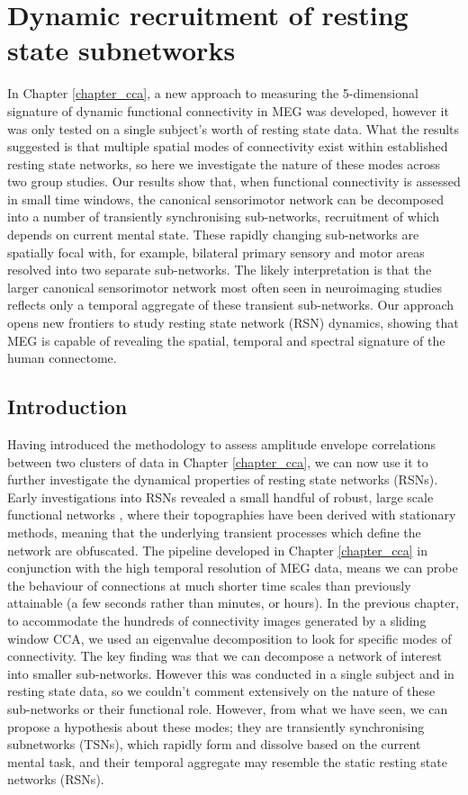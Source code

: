 \chapter{Dynamic recruitment of resting state subnetworks}\label{chap_kmeans}

In Chapter \ref{chapter_cca}, a new approach to measuring the 5-dimensional signature of dynamic functional connectivity in MEG was developed, however it was only tested on a single subject's worth of resting state data. What the results suggested is that multiple spatial modes of connectivity exist within established resting state networks, so here we investigate the nature of these modes across two group studies. Our results show that, when functional connectivity is assessed in small time windows, the canonical sensorimotor network can be decomposed into a number of transiently synchronising sub-networks, recruitment of which depends on current mental state. These rapidly changing sub-networks are spatially focal with, for example, bilateral primary sensory and motor areas resolved into two separate sub-networks. The likely interpretation is that the larger canonical sensorimotor network most often seen in neuroimaging studies reflects only a temporal aggregate of these transient sub-networks. Our approach opens new frontiers to study resting state network (RSN) dynamics, showing that MEG is capable of revealing the spatial, temporal and spectral signature of the human connectome. 

\doublespacing

\section*{Introduction}
Having introduced the methodology to assess amplitude envelope correlations between two clusters of data in Chapter \ref{chapter_cca}, we can now use it to further investigate the dynamical properties of resting state networks (RSNs). Early investigations into RSNs revealed a small handful of robust, large scale functional networks \citep{Biswal1995,Raichle2001,Fox2005,Beckmann2005,Smith2009,Brookes2011}, where their topographies have been derived with stationary methods, meaning that the underlying transient processes which define the network are obfuscated. The pipeline developed in Chapter \ref{chapter_cca} in conjunction with the high temporal resolution of MEG data, means we can probe the behaviour of connections at much shorter time scales than previously attainable (a few seconds rather than minutes, or hours). In the previous chapter, to accommodate the hundreds of connectivity images generated by a sliding window CCA, we used an eigenvalue decomposition to look for specific modes of connectivity. The key finding was that we can decompose a network of interest into smaller sub-networks. However this was conducted in a single subject and in resting state data, so we couldn't comment extensively on the nature of these sub-networks or their functional role. However,  from what we have seen, we can propose a hypothesis about these modes; they are transiently synchronising subnetworks (TSNs), which rapidly form and dissolve based on the current mental task, and their temporal aggregate may resemble the static resting state networks (RSNs).  

